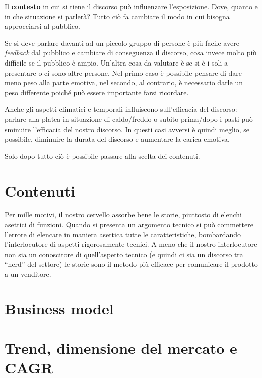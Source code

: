Il \textbf{contesto} in cui si tiene il discorso può influenzare l'esposizione.
Dove, quanto e in che situazione si parlerà?
Tutto ciò fa cambiare il modo in cui bisogna approcciarsi al pubblico.

Se si deve parlare davanti ad un piccolo gruppo di persone è più facile avere
\emph{feedback} dal pubblico e cambiare di conseguenza il discorso, cosa invece
molto più difficile se il pubblico è ampio. Un'altra cosa da valutare è se si è
i soli a presentare o ci sono altre persone. Nel primo caso è possibile pensare
di dare meno peso alla parte emotiva, nel secondo, al contrario, è necessario
darle un peso differente poiché può essere importante farsi ricordare.

Anche gli aspetti climatici e temporali influiscono sull'efficacia del
discorso: parlare alla platea in situazione di caldo/freddo o subito prima/dopo
i pasti può sminuire l'efficacia del nostro discorso. In questi casi avversi è
quindi meglio, se possibile, diminuire la durata del discorso e aumentare la
carica emotiva.

Solo dopo tutto ciò è possibile passare alla scelta dei contenuti.

\section{Contenuti}


Per mille motivi, il nostro cervello assorbe bene le storie, piuttosto di
elenchi asettici di funzioni. Quando si presenta un argomento tecnico si può
commettere l'errore di elencare in maniera asettica tutte le caratteristiche,
bombardando l'interlocutore di aspetti rigorosamente tecnici. A meno che il
nostro interlocutore non sia un conoscitore di quell'aspetto tecnico (e quindi
ci sia un discorso tra ``nerd'' del settore) le storie sono il metodo più
efficace per comunicare il prodotto a un venditore.

\section{Business model}


\section{Trend, dimensione del mercato e CAGR}

